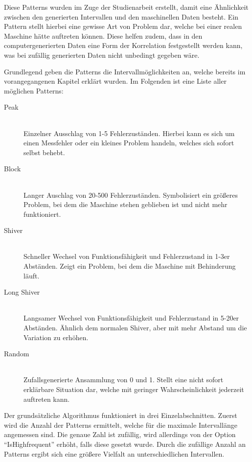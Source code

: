 Diese Patterns wurden im Zuge der Studienarbeit erstellt, damit eine Ähnlichkeit zwischen den generierten Intervallen und den maschinellen Daten besteht. Ein Pattern stellt hierbei eine gewisse Art von Problem dar, welche bei einer realen Maschine hätte auftreten können. Diese helfen zudem, dass in den computergenerierten Daten eine Form der Korrelation festgestellt werden kann, was bei zufällig generierten Daten nicht unbedingt gegeben wäre. 

Grundlegend geben die Patterns die Intervallmöglichkeiten an, welche bereits im vorangegangenen Kapitel erklärt wurden. Im Folgenden ist eine Liste aller möglichen Patterns:

\vspace{10pt}
\begin{description} 
	\item[Peak] \hfill \\ Einzelner Ausschlag von 1-5 Fehlerzuständen. Hierbei kann es sich um einen Messfehler oder ein kleines Problem handeln, welches sich sofort selbst behebt.
	\item[Block] \hfill \\ Langer Auschlag von 20-500 Fehlerzuständen. Symbolisiert ein größeres Problem, bei dem die Maschine stehen geblieben ist und nicht mehr funktioniert.
	\item[Shiver] \hfill \\ Schneller Wechsel von Funktionsfähigkeit und Fehlerzustand in 1-3er Abständen. Zeigt ein Problem, bei dem die Maschine mit Behinderung läuft.
	\item[Long Shiver] \hfill \\ Langsamer Wechsel von Funktionsfähigkeit und Fehlerzustand in 5-20er Abständen. Ähnlich dem normalen Shiver, aber mit mehr Abstand um die Variation zu erhöhen.
	\item[Random] \hfill \\ Zufallsgenerierte Ansammlung von 0 und 1. Stellt eine nicht sofort erklärbare Situation dar, welche mit geringer Wahrscheinlichkeit jederzeit auftreten kann.
\end{description}


\vspace{10pt}
Der grundsätzliche Algorithmus funktioniert in drei Einzelabschnitten. Zuerst wird die Anzahl der Patterns ermittelt, welche für die maximale Intervallänge angemessen sind. Die genaue Zahl ist zufällig, wird allerdings von der Option \enquote{IsHighfrequent} erhöht, falls diese gesetzt wurde. Durch die zufällige Anzahl an Patterns ergibt sich eine größere Vielfalt an unterschiedlichen Intervallen.


